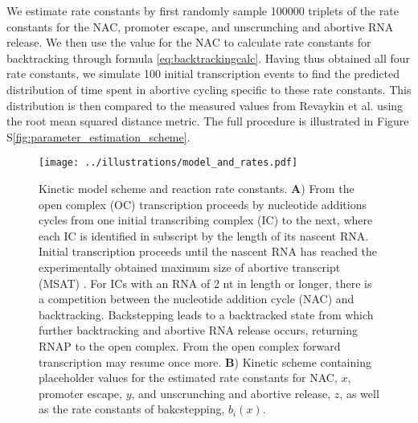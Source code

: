 We estimate rate constants by first randomly sample 100000 triplets of the
rate constants for the NAC, promoter escape, and unscrunching and abortive RNA
release. We then use the value for the NAC to calculate rate constants for
backtracking through formula \eqref{eq:backtrackingcalc}. Having thus obtained
all four rate constants, we simulate 100 initial transcription events to find the
predicted distribution of time spent in abortive cycling specific to these
rate constants. This distribution is then compared to the measured values from
Revaykin et al. \cite{revyakin_abortive_2006} using the root mean squared
distance metric. The full procedure is illustrated in Figure
S\ref{fig:parameter_estimation_scheme}.

\begin{figure}
	\begin{center}
        \texttt{[image: ../illustrations/model\_and\_rates.pdf]}
	\end{center}
    \caption{Kinetic model scheme and reaction rate constants.  \textbf{A})
    From the open complex (OC) transcription proceeds by nucleotide additions
    cycles from one initial transcribing complex (IC) to the next, where each
    IC is identified in subscript by the length of its nascent RNA. Initial
    transcription proceeds until the nascent RNA has reached the
    experimentally obtained maximum size of abortive transcript (MSAT)
    \cite{hsu_initial_2006}. For ICs with an RNA of 2 nt in length or longer, there is a
    competition between the nucleotide addition cycle (NAC) and backtracking.
    Backstepping leads to a backtracked state from which further backtracking
    and abortive RNA release occurs, returning RNAP to the open complex. From
    the open complex forward transcription may resume once more. \textbf{B})
    Kinetic scheme containing placeholder values for the estimated rate
    constants for NAC, $x$, promoter escape, $y$, and unscrunching and abortive
    release, $z$, as well as the rate constants of bakcstepping, $b_i(x)$.}
    \label{fig:model_and_rates}
\end{figure}

